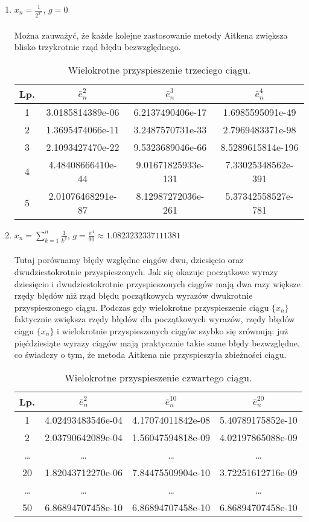 \documentclass{article}
\begin{document}
\begin{enumerate}
\item $x_n = \frac{1}{2^{2^n}}$, $g = 0$ \\ \\
Można zauważyć, że każde kolejne zastosowanie metody Aitkena zwiększa blisko trzykrotnie rząd błędu bezwzględnego.
\begin{table}[h]
\centering
\begin{tabular}[c]{|c|c|c|c|}
\hline
\textbf{Lp.} & $\bar{e}_n^{2}$ & $\bar{e}_n^{3}$ & $\bar{e}_n^{4}$\\
\hline
1 & 
3.0185814389e-06 &
6.2137490406e-17 &
1.6985595091e-49 \\
\hline
2 &
1.3695474066e-11 &
3.2487570731e-33 &
2.7969483371e-98 \\
\hline
3 &
2.1093427470e-22 &
9.5323689046e-66 &
8.5289615814e-196 \\
\hline
4 &
4.48408666410e-44 &
9.01671825933e-131 &
7.33025348562e-391 \\
\hline
5 &
2.01076468291e-87 &
8.12987272036e-261 &
5.37342558527e-781 \\
\hline
\end{tabular}
\caption{Wielokrotne przyspieszenie trzeciego ciągu.}
\end{table}

\item $x_n =\sum\limits_{k=1}^n \frac{1}{k^4}$, $g = \frac{\pi^4}{90} \approx 1.0823232337111381$  \\ \\
Tutaj porównamy błędy względne ciągów dwu, dziesięcio oraz dwudziestokrotnie przyspieszonych. Jak się okazuje początkowe wyrazy dziesięcio i dwudziestokrotnie przyspieszonych ciągów mają dwa razy większe rzędy błędów niż rząd błędu początkowych wyrazów dwukrotnie przyspieszonego ciągu. Podczas gdy wielokrotne przyspieszenie ciągu $\{x_n\}$ faktycznie zwiększa rzędy błędów dla początkowych wyrazów, rzędy błędów ciągu $\{x_n\}$ i wielokrotnie przyspieszonych ciągów szybko się zrównują: już pięćdziesiąte wyrazy ciągów mają praktycznie takie same błędy bezwzględne, co świadczy o tym, że metoda Aitkena nie przyspieszyła zbieżności ciągu.

\begin{table}[h]
\centering
\begin{tabular}[c]{|c|c|c|c|}
\hline
\textbf{Lp.} & $\bar{e}_n^{2}$ & $\bar{e}_n^{10}$ & $\bar{e}_n^{20}$\\
\hline
1 & 
4.02493483546e-04 &
4.17074011842e-08 &
5.40789175852e-10 \\
\hline
2 &
2.03790642089e-04 &
1.56047594818e-09 &
4.02197865088e-09 \\
\hline
\dots & \ldots & \ldots & \ldots \\
\hline
20 &
1.82043712270e-06 &
7.84475509904e-10 &
3.72251612716e-09 \\
\hline
\dots & \ldots & \ldots & \ldots \\
\hline
50 &
6.86894707458e-10 &
6.86894707458e-10 &
6.86894707458e-10 \\
\hline
\end{tabular}
\caption{Wielokrotne przyspieszenie czwartego ciągu.}
\end{table}


\end{enumerate}
\end{document}
